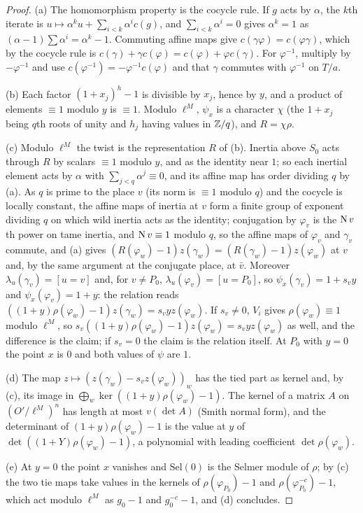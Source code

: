 \begin{proof}
(a) The homomorphism property is the cocycle rule. If $g$ acts by $\alpha$, the $k$th iterate is $u\mapsto\alpha^ku+\sum_{i<k}\alpha^ic(g)$, and $\sum_{i<k}\alpha^i=0$ gives $\alpha^k=1$ as $(\alpha-1)\sum\alpha^i=\alpha^k-1$. Commuting affine maps give $c(\gamma\varphi)=c(\varphi\gamma)$, which by the cocycle rule is
$c(\gamma)+\gamma c(\varphi)=c(\varphi)+\varphi c(\gamma)$. For $\varphi^{-1}$, multiply by $-\varphi^{-1}$ and use $c(\varphi^{-1})=-\varphi^{-1}c(\varphi)$ and that $\gamma$ commutes with $\varphi^{-1}$ on $T/a$.

(b) Each factor $(1+x_j)^{h}-1$ is divisible by $x_j$, hence by $y$, and a product of elements $\equiv1$ modulo $y$ is $\equiv1$. Modulo $\ell^M$, $\psi_x$ is a character $\chi$ (the $1+x_j$ being $q$th roots of unity and $h_j$ having values in $\mathbb{Z}/q$), and $R=\chi\rho$.

(c) Modulo $\ell^M$ the twist is the representation $R$ of (b). Inertia above $S_0$ acts through $R$ by scalars $\equiv1$ modulo $y$, and as the identity near $1$; so each inertial element acts by $\alpha$ with $\sum_{j<q}\alpha^j\equiv0$, and its affine map has order dividing $q$ by (a). As $q$ is prime to the place $v$ (its norm is
$\equiv1$ modulo $q$) and the cocycle is locally constant, the affine maps of inertia at $v$ form a finite group of exponent dividing $q$ on which wild inertia acts as the identity; conjugation by $\varphi_v$ is the $\operatorname{N} v$th power on tame inertia, and $\operatorname{N} v\equiv1$ modulo $q$, so the affine maps of $\varphi_v$ and $\gamma_v$
commute, and (a) gives $(R(\varphi_w)-1)z(\gamma_w)=(R(\gamma_w)-1)z(\varphi_w)$ at $v$ and, by the same argument at the conjugate place, at $\bar v$. Moreover $\lambda_u(\gamma_v)=[u=v]$ and, for $v\ne P_0$, $\lambda_u(\varphi_v)=[u=P_0]$, so $\psi_x(\gamma_v)=1+s_vy$ and $\psi_x(\varphi_v)=1+y$: the relation reads
$((1+y)\rho(\varphi_w)-1)z(\gamma_w)=s_vyz(\varphi_w)$. If $s_v\ne0$, $V_i$ gives $\rho(\varphi_w)\equiv1$ modulo $\ell^M$, so $s_v((1+y)\rho(\varphi_w)-1)z(\varphi_w)=s_vyz(\varphi_w)$ as well, and the difference is the claim; if $s_v=0$ the claim is the relation itself. At $P_0$ with $y=0$ the point $x$ is $0$ and both
values of $\psi$ are $1$.

(d) The map $z\mapsto(z(\gamma_w)-s_vz(\varphi_w))_w$ has the tied part as kernel and, by (c), its image in $\bigoplus_w\ker((1+y)\rho(\varphi_w)-1)$. The kernel of a matrix $A$ on $(O'/\ell^M)^n$ has length at most $v(\det A)$ (Smith normal form), and the determinant of $(1+y)\rho(\varphi_w)-1$ is the value at $y$ of
$\det((1+Y)\rho(\varphi_w)-1)$, a polynomial with leading coefficient $\det\rho(\varphi_w)$.

(e) At $y=0$ the point $x$ vanishes and $\mathrm{Sel}(0)$ is the Selmer module of $\rho$; by (c) the two tie maps take values in the kernels of $\rho(\varphi_{P_0})-1$ and $\rho(\varphi_{P_0}^{-c})-1$, which act modulo $\ell^M$ as $g_0-1$ and $g_0^{-c}-1$, and (d) concludes.
\end{proof}

